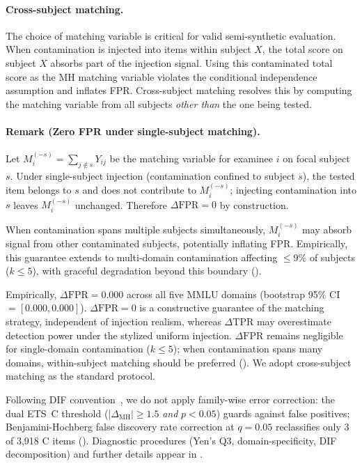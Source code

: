 \paragraph{Cross-subject matching.} The choice of matching variable is critical for valid semi-synthetic evaluation. When contamination is injected into items within subject $X$, the total score on subject $X$ absorbs part of the injection signal. Using this contaminated total score as the MH matching variable violates the conditional independence assumption and inflates FPR. Cross-subject matching resolves this by computing the matching variable from all subjects \emph{other than} the one being tested.

\paragraph{Remark (Zero FPR under single-subject matching).}
\label{prop:fpr}
Let $M_i^{(-s)} = \sum_{j \notin s} Y_{ij}$ be the matching variable for examinee $i$ on focal subject $s$. Under single-subject injection (contamination confined to subject $s$), the tested item belongs to $s$ and does not contribute to $M_i^{(-s)}$; injecting contamination into $s$ leaves $M_i^{(-s)}$ unchanged. Therefore $\Delta\mathrm{FPR} = 0$ by construction.

When contamination spans multiple subjects simultaneously, $M_i^{(-s)}$ may absorb signal from other contaminated subjects, potentially inflating FPR. Empirically, this guarantee extends to multi-domain contamination affecting $\leq$9\% of subjects ($k \leq 5$), with graceful degradation beyond this boundary ().

Empirically, $\Delta\mathrm{FPR} = 0.000$ across all five MMLU domains (bootstrap 95\% CI $= [0.000, 0.000]$). $\Delta\mathrm{FPR} = 0$ is a constructive guarantee of the matching strategy, independent of injection realism, whereas $\Delta\mathrm{TPR}$ may overestimate detection power under the stylized uniform injection. $\Delta\mathrm{FPR}$ remains negligible for single-domain contamination ($k \leq 5$); when contamination spans many domains, within-subject matching should be preferred (). We adopt cross-subject matching as the standard protocol.

Following DIF convention~\citep{wainer1993differential}, we do not apply family-wise error correction: the dual ETS~C threshold ($|\Delta_{\mathrm{MH}}| \geq 1.5$ \emph{and} $p < 0.05$) guards against false positives; Benjamini-Hochberg false discovery rate correction at $q = 0.05$ reclassifies only 3 of 3{,}918 C items (). Diagnostic procedures (Yen's Q3, domain-specificity, DIF decomposition) and further details appear in .

